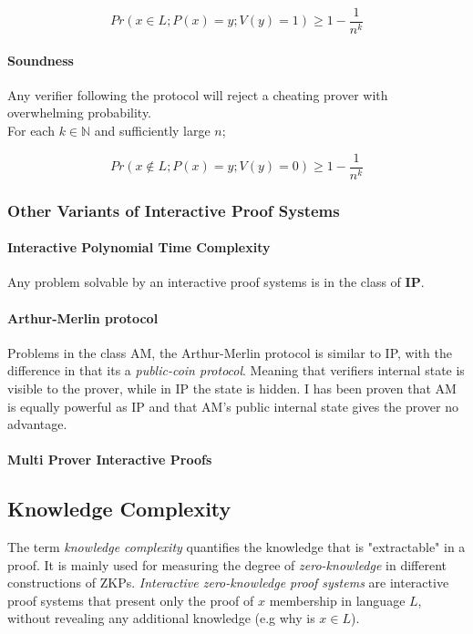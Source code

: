 $$Pr(x \in L; P(x) = y; V(y) = 1) \ge 1 - \frac{1}{n^k}$$

\paragraph{Soundness}

Any verifier following the protocol will reject a cheating prover with overwhelming probability.\\
For each $k \in \mathbb{N}$ and sufficiently large $n$;

$$Pr(x \notin L; P(x) = y; V(y) = 0) \ge 1 - \frac{1}{n^k}$$


\subsubsection{Other Variants of Interactive Proof Systems}

\paragraph{ Interactive Polynomial Time Complexity}
Any problem solvable by an interactive proof systems is in the class of \textbf{IP}.

\paragraph{Arthur-Merlin protocol} Problems in the class AM, the Arthur-Merlin protocol is similar to IP, with the difference in that its a \textit{public-coin protocol}. Meaning that verifiers internal state is visible to the prover, while in IP the state is hidden.
I has been proven that AM is equally powerful as IP and that AM's public internal state gives the prover no advantage.

\paragraph{Multi Prover Interactive Proofs}


\subsection{Knowledge Complexity}

The term \textit{knowledge complexity} quantifies the knowledge that is "extractable" in a proof. It is mainly used for measuring the degree of \textit{zero-knowledge} in different constructions of ZKPs.
\textit{Interactive zero-knowledge proof systems} are interactive proof systems that present only the proof of $x$ membership in language $L$, without revealing any additional knowledge (e.g why is $x \in L$).

